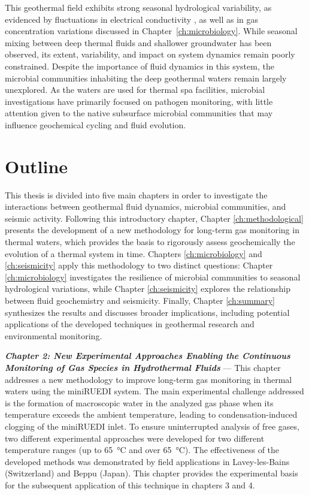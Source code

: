 This geothermal field exhibits strong seasonal hydrological variability, as evidenced by fluctuations in electrical conductivity \citep{sonney2009numerical}, as well as in gas concentration variations discussed in Chapter~\ref{ch:microbiology}.
While seasonal mixing between deep thermal fluids and shallower groundwater has been observed, its extent, variability, and impact on system dynamics remain poorly constrained.
Despite the importance of fluid dynamics in this system, the microbial communities inhabiting the deep geothermal waters remain largely unexplored.
As the waters are used for thermal spa facilities, microbial investigations have primarily focused on pathogen monitoring, with little attention given to the native subsurface microbial communities that may influence geochemical cycling and fluid evolution.


\section{Outline}
This thesis is divided into five main chapters in order to investigate the interactions between geothermal fluid dynamics, microbial communities, and seismic activity.
Following this introductory chapter, Chapter \ref{ch:methodological} presents the development of a new methodology for long-term gas monitoring in thermal waters, which provides the basis to rigorously assess geochemically the evolution of a thermal system in time.
Chapters \ref{ch:microbiology} and \ref{ch:seismicity} apply this methodology to two distinct questions: Chapter \ref{ch:microbiology} investigates the resilience of microbial communities to seasonal hydrological variations, while Chapter \ref{ch:seismicity} explores the relationship between fluid geochemistry and seismicity.
Finally, Chapter \ref{ch:summary} synthesizes the results and discusses broader implications, including potential applications of the developed techniques in geothermal research and environmental monitoring.\vspace{10pt}

\textbf{\textit{Chapter 2: New Experimental Approaches Enabling the Continuous Monitoring of Gas Species in Hydrothermal Fluids}} --- This chapter addresses a new methodology to improve long-term gas monitoring in thermal waters using the miniRUEDI system.
The main experimental challenge addressed is the formation of macroscopic water in the analyzed gas phase when its temperature exceeds the ambient temperature, leading to condensation-induced clogging of the miniRUEDI inlet.
To ensure uninterrupted analysis of free gases, two different experimental approaches were developed for two different temperature ranges (up to \SI{65}{\celsius} and over \SI{65}{\celsius}).
The effectiveness of the developed methods was demonstrated by field applications in Lavey-les-Bains (Switzerland) and Beppu (Japan).
This chapter provides the experimental basis for the subsequent application of this technique in chapters 3 and 4.\vspace{10pt}

